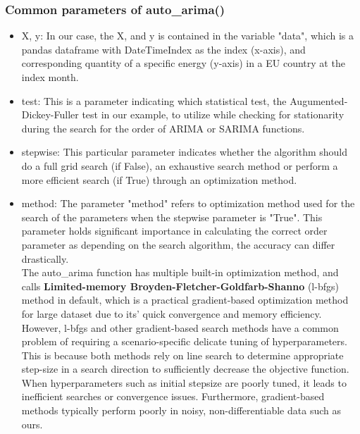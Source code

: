 \documentclass[]{usiinfbachelorproject}
\begin{document}
\subsubsection{Common parameters of auto\_arima()}
\begin{itemize}
\item X, y: In our case, the X, and y is contained in the variable "data", which is a pandas dataframe with DateTimeIndex as the index (x-axis), and corresponding quantity of a specific energy (y-axis) in a EU country at the index month. \\

\item test: This is a parameter indicating which statistical test, the Augumented-Dickey-Fuller test in our example, to utilize while checking for stationarity during the search for the order of ARIMA or SARIMA functions. \\

\item stepwise: This particular parameter indicates whether the algorithm should do a full grid search (if False), an exhaustive search method or perform a more efficient search (if True) through an optimization method. \\

\item method: The parameter "method" refers to optimization method used for the search of the parameters when the stepwise parameter is "True". This parameter holds significant importance in calculating the correct order parameter as depending on the search algorithm, the accuracy can differ drastically.\\

The auto\_arima function has multiple built-in optimization method, and calls \textbf{Limited-memory Broyden-Fletcher-Goldfarb-Shanno} (l-bfgs) method in default, which is a practical gradient-based optimization method for large dataset due to its' quick convergence and memory efficiency. However, l-bfgs and other gradient-based search methods have a common problem of requiring a scenario-specific delicate tuning of hyperparameters. This is because both methods rely on line search to determine appropriate step-size in a search direction to sufficiently decrease the objective function. When hyperparameters such as initial stepsize are poorly tuned, it leads to inefficient searches or convergence issues. Furthermore, gradient-based methods typically perform poorly in noisy, non-differentiable data such as ours.\\


\end{itemize}
\end{document}
